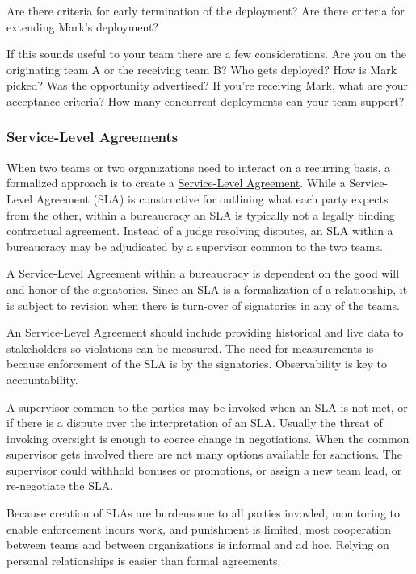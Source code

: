 Are there criteria for early termination of the deployment? Are there criteria for extending Mark's deployment?

If this sounds useful to your team there are a few considerations. Are you on the originating team A or the receiving team B? Who gets deployed? How is Mark picked? Was the opportunity advertised? If you're receiving Mark, what are your acceptance criteria? How many concurrent deployments can your team support?


\subsubsection{Service-Level Agreements\label{sec:sla}}

When two teams or two organizations need to interact on a recurring basis, a formalized approach is to create a \href{https://en.wikipedia.org/wiki/Service-level_agreement}{Service-Level Agreement}. While a Service-Level Agreement (SLA) is constructive for outlining what each party expects from the other, within a bureaucracy an SLA is typically not a legally binding contractual agreement. Instead of a judge resolving disputes, an SLA within a bureaucracy may be adjudicated by a supervisor common to the two teams.

A Service-Level Agreement within a bureaucracy is dependent on the good will and honor of the signatories. Since an SLA is a formalization of a relationship, it is subject to revision when there is turn-over of signatories in any of the teams. 

An Service-Level Agreement should include providing historical and live data to stakeholders so violations can be measured. The need for measurements is because enforcement of the SLA is by the signatories. Observability is key to accountability. 

A supervisor common to the parties may be invoked when an SLA is not met, or if there is a dispute over the interpretation of an SLA. Usually the threat of invoking oversight is enough to coerce change in negotiations. 
When the common supervisor gets involved there are not many options available for sanctions. The supervisor could withhold bonuses or promotions, or assign a new team lead, or re-negotiate the SLA. 

Because creation of SLAs are burdensome to all parties invovled, monitoring to enable enforcement incurs work, and punishment is limited, most cooperation between teams and between organizations is informal and ad hoc. Relying on personal relationships is easier than formal agreements.

